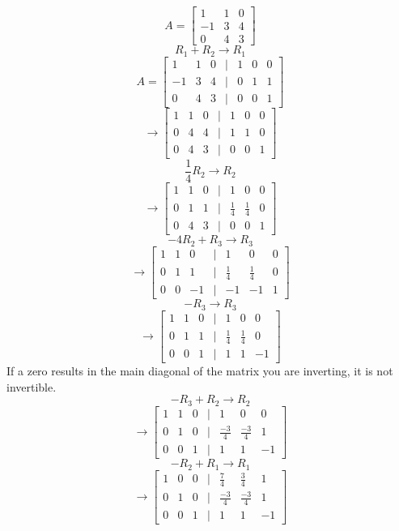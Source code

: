 \begin{example}
	\[A = \begin{bmatrix} 1 & 1 & 0 \\ -1 & 3 & 4 \\ 0 & 4 & 3 \end{bmatrix}  \]
	\[R_1+R_2 \to R_1\]
	\[A = \begin{bmatrix} 1 & 1 & 0 & | & 1 & 0 & 0\\ -1 & 3 & 4 & | & 0 & 1 & 1 \\ 0 & 4 & 3 & | & 0 & 0 & 1 \end{bmatrix}  \]
	\[\to \begin{bmatrix} 1 & 1 & 0 & | & 1 & 0 & 0\\ 0 & 4 & 4 & | & 1 & 1 & 0 \\ 0 & 4 & 3 & | & 0 & 0 & 1 \end{bmatrix}  \]
	\[\frac{1}{4} R_2 \to R_2\]
	\[\to \begin{bmatrix} 1 & 1 & 0 & | & 1 & 0 & 0\\ 0 & 1 & 1 & | & \frac{1}{4} & \frac{1}{4} & 0 \\ 0 & 4 & 3 & | & 0 & 0 & 1 \end{bmatrix}  \]
	\[-4 R_2 + R_3 \to R_3\]
	\[\to \begin{bmatrix} 1 & 1 & 0 & | & 1 & 0 & 0\\ 0 & 1 & 1 & | & \frac{1}{4} & \frac{1}{4} & 0 \\ 0 & 0 & -1 & | & -1 & -1 & 1 \end{bmatrix}  \]
	\[-R_3 \to R_3\]
	\[\to \begin{bmatrix} 1 & 1 & 0 & | & 1 & 0 & 0\\ 0 & 1 & 1 & | & \frac{1}{4} & \frac{1}{4} & 0 \\ 0 & 0 & 1 & | & 1 & 1 & -1 \end{bmatrix}  \]
	If a zero results in the main diagonal of the matrix you are inverting, it is not invertible.
	\[-R_3 + R_2 \to R_2\]
	\[\to \begin{bmatrix} 1 & 1 & 0 & | & 1 & 0 & 0\\ 0 & 1 & 0 & | & \frac{-3}{4} & \frac{-3}{4} & 1 \\ 0 & 0 & 1 & | & 1 & 1 & -1 \end{bmatrix}  \]
	\[-R_2 + R_1 \to R_1\]
	\[\to \begin{bmatrix} 1 & 0 & 0 & | & \frac{7}{4} & \frac{3}{4} & 1\\ 0 & 1 & 0 & | & \frac{-3}{4} & \frac{-3}{4} & 1 \\ 0 & 0 & 1 & | & 1 & 1 & -1 \end{bmatrix}  \]

\end{example}
